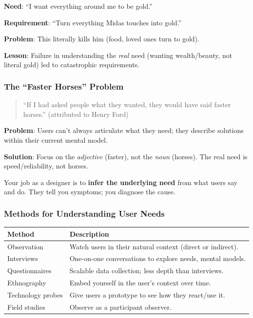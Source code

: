 \begin{exbox}
\textbf{Need}: ``I want everything around me to be gold.''

\textbf{Requirement}: ``Turn everything Midas touches into gold.''

\textbf{Problem}: This literally kills him (food, loved ones turn to gold).

\textbf{Lesson}: Failure in understanding the \textit{real} need (wanting wealth/beauty, not literal gold) led to catastrophic requirements.
\end{exbox}

\subsubsection*{The ``Faster Horses'' Problem}

\begin{quote}
``If I had asked people what they wanted, they would have said faster horses.'' (attributed to Henry Ford)
\end{quote}

\textbf{Problem}: Users can't always articulate what they need; they describe solutions within their current mental model.

\textbf{Solution}: Focus on the \textit{adjective} (faster), not the \textit{noun} (horses). The real need is speed/reliability, not horses.

\begin{tipbox}
Your job as a designer is to \textbf{infer the underlying need} from what users say and do. They tell you symptoms; you diagnose the cause.
\end{tipbox}

\subsubsection*{Methods for Understanding User Needs}

\begin{center}
\renewcommand{\arraystretch}{1.3}
\begin{tabular}{@{} l p{8cm} @{}}
\toprule
\textbf{Method} & \textbf{Description} \\
\midrule
Observation & Watch users in their natural context (direct or indirect). \\
Interviews & One-on-one conversations to explore needs, mental models. \\
Questionnaires & Scalable data collection; less depth than interviews. \\
Ethnography & Embed yourself in the user's context over time. \\
Technology probes & Give users a prototype to see how they react/use it. \\
Field studies & Observe as a participant observer. \\
\bottomrule
\end{tabular}
\end{center}

